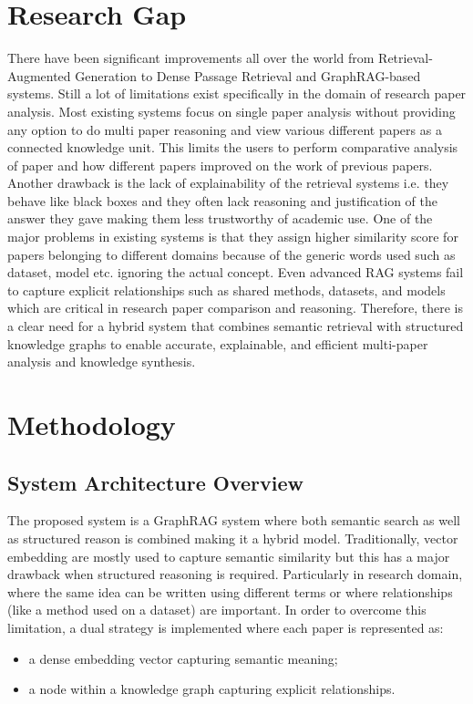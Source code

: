 \documentclass[10pt]{article}
\begin{document}
\section{Research Gap}
There have been significant improvements all over the world from Retrieval-Augmented Generation to Dense Passage Retrieval and GraphRAG-based systems. Still a lot of limitations exist specifically in the domain of research paper analysis. Most existing systems focus on single paper analysis without providing any option to do multi paper reasoning and view various different papers as a connected knowledge unit. This limits the users to perform comparative analysis of paper and how different papers improved on the work of previous papers. Another drawback is the lack of explainability of the retrieval systems i.e. they behave like black boxes and they often lack reasoning and justification of the answer they gave making them less trustworthy of academic use. One of the major problems in existing systems is that they assign higher similarity score for papers belonging to different domains because of the generic words used such as dataset, model etc. ignoring the actual concept. Even advanced RAG systems fail to capture explicit relationships such as shared methods, datasets, and models which are critical in research paper comparison and reasoning. Therefore, there is a clear need for a hybrid system that combines semantic retrieval with structured knowledge graphs to enable accurate, explainable, and efficient multi-paper analysis and knowledge synthesis.

\section{Methodology}
\subsection{System Architecture Overview}
The proposed system is a GraphRAG system where both semantic search as well as structured reason is combined making it a hybrid model. Traditionally, vector embedding are mostly used to capture semantic similarity but this has a major drawback when structured reasoning is required. Particularly in research domain, where the same idea can be written using different terms or where relationships (like a method used on a dataset) are important. In order to overcome this limitation, a dual strategy is implemented where each paper is represented as:
\begin{itemize}[leftmargin=*,noitemsep]
\item a dense embedding vector capturing semantic meaning;
\item a node within a knowledge graph capturing explicit relationships.
\end{itemize}
\end{document}
